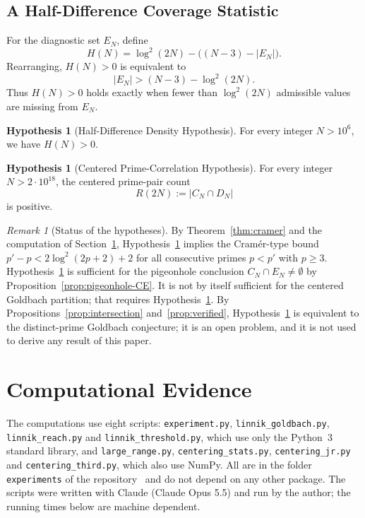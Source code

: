 \documentclass[11pt]{amsart}
\theoremstyle{definition}
\newtheorem{Hypothesis}[Theorem]{Hypothesis}
\theoremstyle{remark}
\newtheorem{Remark}[Theorem]{Remark}
\begin{document}
\subsection{A Half-Difference Coverage Statistic}\label{subsec:gap}
For the diagnostic set $E_N$, define
\[
H(N) = \log^2(2N) - \bigl((N-3) - |E_N|\bigr).
\]
Rearranging, $H(N)>0$ is equivalent to
\[
|E_N| > (N-3) - \log^2(2N).
\]
Thus $H(N)>0$ holds exactly when fewer than $\log^2(2N)$ admissible values are missing from $E_N$.

\begin{Hypothesis}[Half-Difference Density Hypothesis]\label{hyp:half-difference-density}
For every integer $N>10^6$, we have $H(N) > 0$.
\end{Hypothesis}

\begin{Hypothesis}[Centered Prime-Correlation Hypothesis]\label{hyp:centered}
For every integer $N>2\cdot 10^{18}$, the centered prime-pair count
\[
R(2N):=|C_N\cap D_N|
\]
is positive.
\end{Hypothesis}

\begin{Remark}[Status of the hypotheses]
By Theorem~\ref{thm:cramer} and the computation of Section~\ref{sec:computational}, Hypothesis~\ref{hyp:half-difference-density} implies the Cram\'er-type bound $p'-p<2\log^2(2p+2)+2$ for all consecutive primes $p<p'$ with $p\geq 3$. Hypothesis~\ref{hyp:half-difference-density} is sufficient for the pigeonhole conclusion $C_N\cap E_N\neq\emptyset$ by Proposition~\ref{prop:pigeonhole-CE}. It is not by itself sufficient for the centered Goldbach partition; that requires Hypothesis~\ref{hyp:centered}. By Propositions~\ref{prop:intersection} and~\ref{prop:verified}, Hypothesis~\ref{hyp:centered} is equivalent to the distinct-prime Goldbach conjecture; it is an open problem, and it is not used to derive any result of this paper.
\end{Remark}
\section{Computational Evidence}\label{sec:computational}
The computations use eight scripts: \texttt{experiment.py}, \texttt{linnik\_goldbach.py}, \texttt{linnik\_reach.py} and \texttt{linnik\_threshold.py}, which use only the Python~3 standard library, and \texttt{large\_range.py}, \texttt{centering\_stats.py}, \texttt{centering\_jr.py} and \texttt{centering\_third.py}, which also use NumPy. All are in the folder \texttt{experiments} of the repository~\cite{vega2026pigeonlean} and do not depend on any other package. The scripts were written with Claude (Claude Opus 5.5) and run by the author; the running times below are machine dependent.
\end{document}
